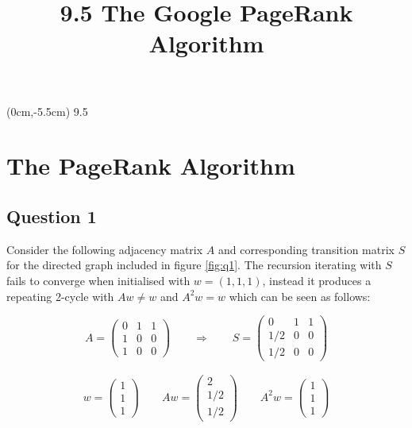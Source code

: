 \documentclass[a4paper]{article}
\title{\vspace*{2cm}9.5 The Google PageRank Algorithm\vspace*{-1.5cm}}
\date{}
\begin{document}
\maketitle

\begin{textblock*}{100mm}(0cm,-5.5cm)
\Huge 9.5
\end{textblock*}

\section*{The PageRank Algorithm}
\subsection*{Question 1}

Consider the following adjacency matrix $A$ and corresponding transition matrix $S$ for the directed graph included in figure \ref{fig:q1}. The recursion iterating with $S$ fails to converge when initialised with $w=(1,1,1)$, instead it produces a repeating 2-cycle with $Aw \neq w$ and $A^2w = w$ which can be seen as follows:

\begin{equation*}
    A = \begin{pmatrix}
        0 & 1 & 1 \\
        1 & 0 & 0 \\
        1 & 0 & 0 
    \end{pmatrix}
    \qquad \Longrightarrow \qquad 
    S = \begin{pmatrix}
          0 & 1 & 1 \\
        1/2 & 0 & 0 \\
        1/2 & 0 & 0 
    \end{pmatrix}
\end{equation*}

\begin{align*}
    w = \begin{pmatrix} 1 \\ 1 \\ 1 \end{pmatrix}
    \qquad
    Aw = \begin{pmatrix} 2 \\ 1/2 \\ 1/2 \end{pmatrix}
    \qquad
    A^2w = \begin{pmatrix} 1 \\ 1 \\ 1 \end{pmatrix}
\end{align*}
\end{document}
